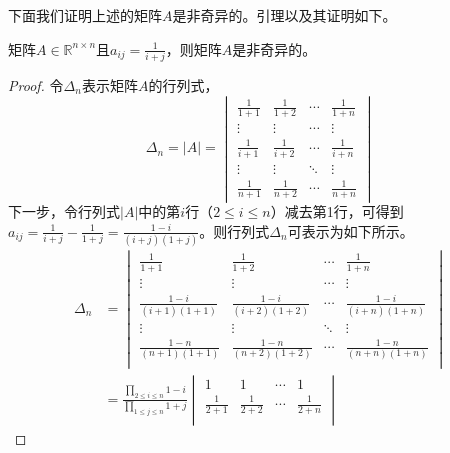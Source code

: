 下面我们证明上述的矩阵$A$是非奇异的。引理以及其证明如下。

\begin{lemma}\label{lem:nonsingular}
矩阵$A \in \mathbb{R}^{n \times n}$且$a_{ij} = \frac{1}{i+j}$，则矩阵$A$是非奇异的。
\end{lemma}
\begin{proof}
令$\Delta_{n}$表示矩阵$A$的行列式，
\begin{equation}\label{eq:detetminant1}
    \Delta_{n}=\left\vert A \right\vert=
    \begin{vmatrix}
    \frac{1}{1+1} & \frac{1}{1+2} & \cdots & \frac{1}{1+n} \\
    \vdots & \vdots & \cdots & \vdots \\
    \frac{1}{i+1} & \frac{1}{i+2} & \cdots & \frac{1}{i+n} \\
    \vdots & \vdots & \ddots & \vdots \\
    \frac{1}{n+1} & \frac{1}{n+2} & \cdots & \frac{1}{n+n}
    \end{vmatrix}
\end{equation}
下一步，令行列式$\left\vert A \right\vert$中的第$i$行（$2\leq i \leq n$）减去第1行，可得到$a_{ij} = \frac{1}{i+j}-\frac{1}{1+j}=\frac{1-i}{\left(i+j\right)\left(1+j\right)}$。则行列式$\Delta_n$可表示为如下所示。
\begin{equation}\label{eq:detetminant2}
\begin{split}
    \Delta_n & =
    \begin{vmatrix}
    \frac{1}{1+1} & \frac{1}{1+2} & \cdots & \frac{1}{1+n} \\
    \vdots & \vdots & \cdots & \vdots \\
    \frac{1-i}{\left(i+1\right)\left(1+1\right)} & \frac{1-i}{\left(i+2\right)\left(1+2\right)} & \cdots & \frac{1-i}{\left(i+n\right)\left(1+n\right)} \\
    \vdots & \vdots & \ddots & \vdots \\
    \frac{1-n}{\left(n+1\right)\left(1+1\right)} & \frac{1-n}{\left(n+2\right)\left(1+2\right)} & \cdots & \frac{1-n}{\left(n+n\right)\left(1+n\right)} \\
    \end{vmatrix}\\
    & =
    \frac{\prod\limits_{2\leq i \leq n}{1-i}}{\prod\limits_{1\leq j \leq n}{1+j}}
    \begin{vmatrix}
    1 & 1 & \cdots & 1 \\
    \frac{1}{2+1} & \frac{1}{2+2} & \cdots & \frac{1}{2+n} \\

\end{vmatrix}
\end{split}
\end{equation}
\end{proof}
